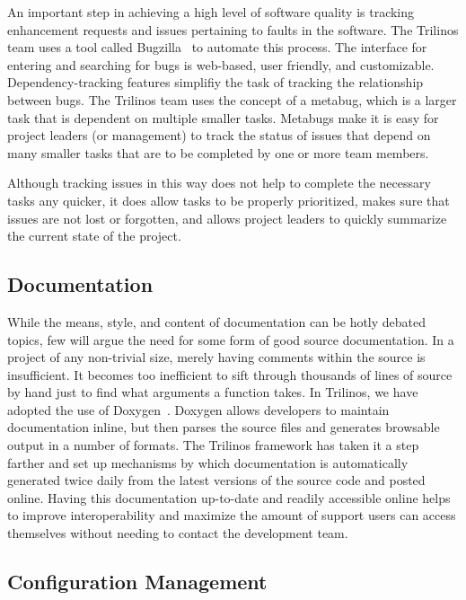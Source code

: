 \documentclass[12pt,relax]{article}
\begin{document}

An important step in achieving a high level of software quality is tracking
enhancement requests and issues pertaining to faults in the software.  The
Trilinos team uses a tool called Bugzilla~\cite{Bugzilla} to automate this
process.  The interface for entering and searching for bugs is web-based, user
friendly, and customizable.  Dependency-tracking features simplifiy the task of
tracking the relationship between bugs.  The Trilinos team uses the concept of a
metabug, which is a larger task that is dependent on multiple smaller tasks. 
Metabugs make it is easy for project leaders (or management) to track the
status of issues that depend on many smaller tasks that are to be completed by
one or more team members.

Although tracking issues in this way does not help to complete the
necessary tasks any quicker, it does allow tasks to be properly prioritized, 
makes sure that issues are not lost or forgotten, and allows project leaders
to quickly summarize the current state of the project.

\subsection{Documentation}


While the means, style, and content of documentation can be hotly debated
topics, few will argue the need for some form of good source documentation.
In a project of any non-trivial size, merely having comments within the source
is insufficient.  It becomes too inefficient to sift through thousands of lines
of source by hand just to find what arguments a function takes.  In Trilinos,
we have adopted the use of Doxygen~\cite{Doxygen}.  Doxygen allows developers
to maintain documentation inline, but then parses the source files and generates
browsable output in a number of formats.  The Trilinos framework has taken it a
step farther and set up mechanisms by which documentation is automatically
generated twice daily from the latest versions of the source code and posted
online.  Having this documentation up-to-date and readily accessible online
helps to improve interoperability and maximize the amount of support users can
access themselves without needing to contact the development team.

\subsection{Configuration Management}
\end{document}
